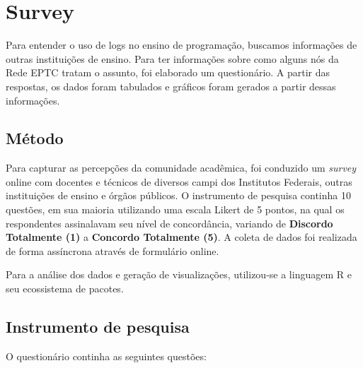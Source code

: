 \chapter{Survey}

Para entender o uso de logs no ensino de programação, buscamos informações de outras instituições de ensino. Para ter informações sobre como alguns nós da Rede EPTC tratam o assunto, foi elaborado um questionário. A partir das respostas, os dados foram tabulados e gráficos foram gerados a partir dessas informações. 


\section{Método}

Para capturar as percepções da comunidade acadêmica, foi conduzido um \textit{survey} online com docentes e técnicos de diversos campi dos Institutos Federais, outras instituições de ensino e órgãos públicos. O instrumento de pesquisa continha 10 questões, em sua maioria utilizando uma escala Likert de 5 pontos, na qual os respondentes assinalavam seu nível de concordância, variando de \textbf{Discordo Totalmente (1)} a \textbf{Concordo Totalmente (5)}. A coleta de dados foi realizada de forma assíncrona através de formulário online.

Para a análise dos dados e geração de visualizações, utilizou-se a linguagem R e seu ecossistema de pacotes.

\section{Instrumento de pesquisa}
O questionário continha as seguintes questões:

